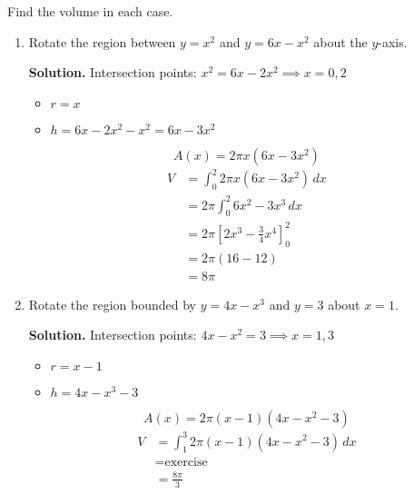 \begin{Example}{}{}
    Find the volume in each case.
    \begin{enumerate}[label=(\roman*)]
        \item Rotate the region between $ y=x^2 $ and $ y=6x-x^2 $
              about the $ y $-axis.



              \textbf{Solution.} Intersection points:
              $ x^2=6x-2x^2\implies x=0,2 $
              \begin{itemize}
                  \item $ r=x $
                  \item $ h=6x-2x^2-x^2=6x-3x^2 $
              \end{itemize}
              \[ A(x)=2\pi x\left( 6x-3x^2 \right) \]
              \begin{align*}
                  V
                   & =\int_{0}^{2} 2\pi x\left( 6x-3x^2 \right)\, d{x} \\
                   & =2\pi \int_{0}^{2} 6x^2-3x^3\, d{x}               \\
                   & =2\pi\left[ 2x^3-\frac{3}{4} x^4 \right]_0^2      \\
                   & =2\pi\left( 16-12 \right)                         \\
                   & =8\pi
              \end{align*}
        \item Rotate the region bounded by $ y=4x-x^3 $ and $ y=3 $ about
              $ x= 1 $.

              \textbf{Solution.} Intersection points:
              $ 4x-x^2=3\implies x=1,3 $
              \begin{itemize}
                  \item $ r=x-1 $
                  \item $ h=4x-x^3-3 $
              \end{itemize}
              \[ A(x)=2\pi(x-1)(4x-x^2-3) \]
              \begin{align*}
                  V
                   & =\int_{1}^{3}2\pi(x-1)(4x-x^2-3) \, d{x} \\
                   & =\text{exercise}                         \\
                   & =\frac{8\pi}{3}
              \end{align*}
    \end{enumerate}
\end{Example}

